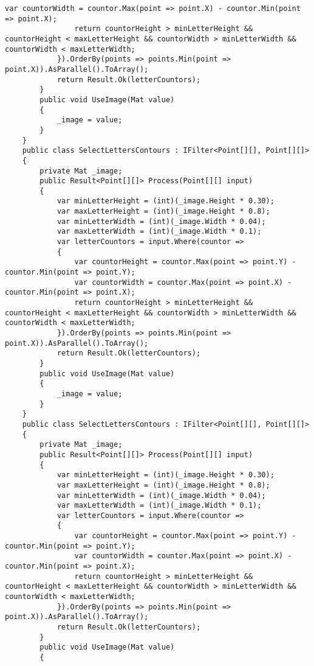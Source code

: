 \begin{lstlisting}[style=fsharpstyle,caption={Исходный код}, label=lst:recognition_result_handler]
                var countorWidth = countor.Max(point => point.X) - countor.Min(point => point.X);
                return countorHeight > minLetterHeight && countorHeight < maxLetterHeight && countorWidth > minLetterWidth && countorWidth < maxLetterWidth;
            }).OrderBy(points => points.Min(point => point.X)).AsParallel().ToArray();
            return Result.Ok(letterCountors);
        }
        public void UseImage(Mat value)
        {
            _image = value;
        }
    }
    public class SelectLettersContours : IFilter<Point[][], Point[][]>
    {
        private Mat _image;
        public Result<Point[][]> Process(Point[][] input)
        {
            var minLetterHeight = (int)(_image.Height * 0.30);
            var maxLetterHeight = (int)(_image.Height * 0.8);
            var minLetterWidth = (int)(_image.Width * 0.04);
            var maxLetterWidth = (int)(_image.Width * 0.1);
            var letterCountors = input.Where(countor =>
            {
                var countorHeight = countor.Max(point => point.Y) - countor.Min(point => point.Y);
                var countorWidth = countor.Max(point => point.X) - countor.Min(point => point.X);
                return countorHeight > minLetterHeight && countorHeight < maxLetterHeight && countorWidth > minLetterWidth && countorWidth < maxLetterWidth;
            }).OrderBy(points => points.Min(point => point.X)).AsParallel().ToArray();
            return Result.Ok(letterCountors);
        }
        public void UseImage(Mat value)
        {
            _image = value;
        }
    }
    public class SelectLettersContours : IFilter<Point[][], Point[][]>
    {
        private Mat _image;
        public Result<Point[][]> Process(Point[][] input)
        {
            var minLetterHeight = (int)(_image.Height * 0.30);
            var maxLetterHeight = (int)(_image.Height * 0.8);
            var minLetterWidth = (int)(_image.Width * 0.04);
            var maxLetterWidth = (int)(_image.Width * 0.1);
            var letterCountors = input.Where(countor =>
            {
                var countorHeight = countor.Max(point => point.Y) - countor.Min(point => point.Y);
                var countorWidth = countor.Max(point => point.X) - countor.Min(point => point.X);
                return countorHeight > minLetterHeight && countorHeight < maxLetterHeight && countorWidth > minLetterWidth && countorWidth < maxLetterWidth;
            }).OrderBy(points => points.Min(point => point.X)).AsParallel().ToArray();
            return Result.Ok(letterCountors);
        }
        public void UseImage(Mat value)
        {

\end{lstlisting}
